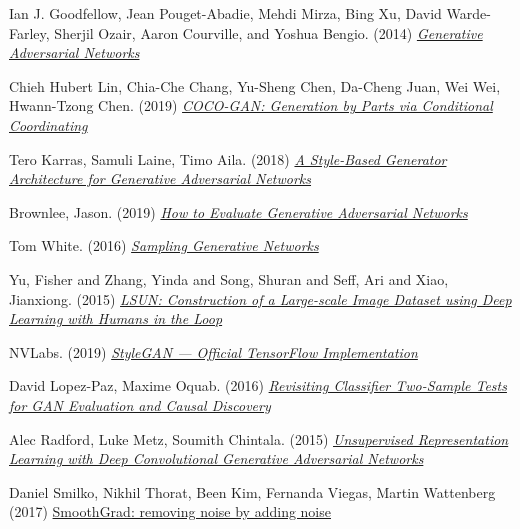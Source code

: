 \documentclass{article}
\begin{document}
\newpage
\begin{thebibliography}{9}
        Ian J. Goodfellow, Jean Pouget-Abadie, Mehdi Mirza, Bing Xu, David Warde-Farley, Sherjil Ozair, Aaron Courville, and Yoshua Bengio. (2014)
        \href{https://papers.nips.cc/paper/2014/file/5ca3e9b122f61f8f06494c97b1afccf3-Paper.pdf}{\textit{Generative Adversarial Networks} }

        Chieh Hubert Lin, Chia-Che Chang, Yu-Sheng Chen, Da-Cheng Juan, Wei Wei, Hwann-Tzong Chen. (2019)
        \href{https://arxiv.org/pdf/1904.00284.pdf}{\textit{COCO-GAN: Generation by Parts via Conditional Coordinating} }

        Tero Karras, Samuli Laine, Timo Aila. (2018)
        \href{https://arxiv.org/pdf/1812.04948.pdf}{\textit{A Style-Based Generator Architecture for Generative Adversarial Networks} }

        Brownlee, Jason. (2019)
        \href{https://machinelearningmastery.com/how-to-evaluate-generative-adversarial-networks/}{\textit{How to Evaluate Generative Adversarial Networks}}

        Tom White. (2016)
        \href{https://arxiv.org/pdf/1609.04468.pdf}{\textit{Sampling Generative Networks} }

        Yu, Fisher and Zhang, Yinda and Song, Shuran and Seff, Ari and Xiao, Jianxiong. (2015)
        \href{https://arxiv.org/pdf/1506.03365.pdf}{\textit{LSUN: Construction of a Large-scale Image Dataset using Deep Learning with Humans in the Loop}}

        NVLabs. (2019) \href{https://github.com/NVlabs/stylegan}{\textit{StyleGAN — Official TensorFlow Implementation}}

        David Lopez-Paz, Maxime Oquab. (2016)
        \href{https://research.fb.com/wp-content/uploads/2017/04/neural_tests.pdf?}{\textit{Revisiting Classifier Two-Sample Tests for GAN Evaluation and Causal Discovery}}

        Alec Radford, Luke Metz, Soumith Chintala. (2015)
        \href{https://arxiv.org/pdf/1511.06434.pdf}{\textit{Unsupervised Representation Learning with Deep Convolutional Generative Adversarial Networks}}

        Daniel Smilko, Nikhil Thorat, Been Kim, Fernanda Viegas, Martin Wattenberg (2017)
        \href{https://arxiv.org/pdf/1706.03825.pdf}{SmoothGrad: removing noise by adding noise}

    \end{thebibliography}
    
\end{document}
